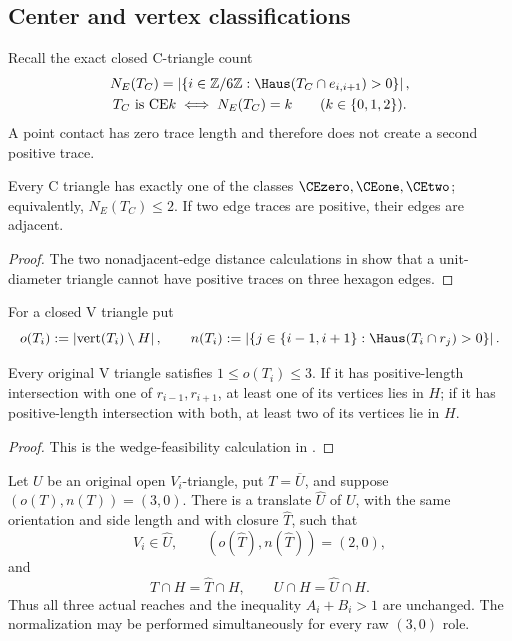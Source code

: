 \subsection{Center and vertex classifications}

Recall the exact closed C-triangle count
\[
 \begin{gathered}
 N_E(T_C)=
 \left\lvert\left\{i\in\mathbb Z/6\mathbb Z:
 \Haus(T_C\cap e_{i,i+1})>0\right\}\right\rvert,\\
 T_C\text{ is CE}k\iff N_E(T_C)=k
 \qquad(k\in\{0,1,2\}).
 \end{gathered}
\]
A point contact has zero trace length and therefore does not create a second
positive trace.

\begin{proposition}
\label{prop:ce-classification}
Every C triangle has exactly one of the classes $\CEzero,\CEone,\CEtwo$;
equivalently, $N_E(T_C)\le2$.  If two edge traces are positive, their edges
are adjacent.
\end{proposition}

\begin{proof}
The two nonadjacent-edge distance calculations in
 show that a unit-diameter triangle cannot
have positive traces on three hexagon edges.
\end{proof}

For a closed V triangle put
\[
 o(T_i):=\left\lvert\operatorname{vert}(T_i)\setminus H\right\rvert,
 \qquad
 n(T_i):=\left\lvert\left\{j\in\{i-1,i+1\}:
 \Haus(T_i\cap r_j)>0\right\}\right\rvert.
\]

\begin{lemma}
\label{lem:local-wedge}
Every original V triangle satisfies $1\le o(T_i)\le3$.  If it has
positive-length intersection with one of $r_{i-1},r_{i+1}$, at least one of
its vertices lies in $H$; if it has positive-length intersection with both,
at least two of its vertices lie in $H$.
\end{lemma}

\begin{proof}
This is the wedge-feasibility calculation in
.
\end{proof}

\begin{proposition}
\label{prop:vd0-exact-trace-normalization}
Let $U$ be an original open $V_i$-triangle, put $T=\overline U$, and suppose
$(o(T),n(T))=(3,0)$.  There is a translate $\widehat U$ of $U$, with the
same orientation and side length and with closure $\widehat T$, such that
\[
 V_i\in\widehat U,
 \qquad
 (o(\widehat T),n(\widehat T))=(2,0),
\]
and
\[
 T\cap H=\widehat T\cap H,
 \qquad
 U\cap H=\widehat U\cap H.
\]
Thus all three actual reaches and the inequality $A_i+B_i>1$ are unchanged.
The normalization may be performed simultaneously for every raw $(3,0)$
role.
\end{proposition}

